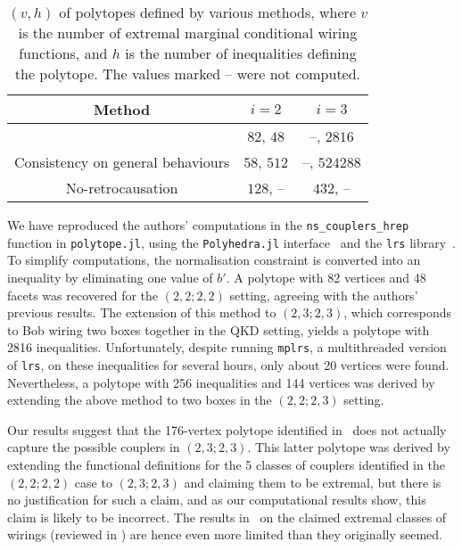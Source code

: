 \documentclass[10pt, a4paper]{article}
\numberwithin{equation}{section} %
\theoremstyle{definition}
\theoremstyle{plain}
\newenvironment{Tabular}[1] %
{\def\arraystretch{1.75}\begin{tabular}{#1}}
{\end{tabular}}
\newcommand{\?}{\mathrel{?}} %
\begin{document}
                  \begin{table}
                    \centering
                    \begin{Tabular}{ccc} 
                      \toprule
                      Method & \(i = 2\) & \(i = 3\) \\
                      \midrule
                      \cite{ShortEntangleSwap} & \(82\), \(48\)  & --, \(2816\) \\
                      Consistency on general behaviours & \(58\), \(512\) & --, \(524288\) \\
                      No-retrocausation & \(128\), -- & \(432\), -- \\
                      \bottomrule
                    \end{Tabular}
                    \caption{\((v,h)\) of polytopes defined by various methods, where \(v\) is the number of extremal marginal conditional wiring functions, and \(h\) is the number of inequalities defining the polytope. The values marked -- were not computed.}\label{tab:polys}
                  \end{table}

                  We have reproduced the authors' computations in the \verb`ns_couplers_hrep` function in \texttt{polytope.jl}, using the \verb`Polyhedra.jl` interface~\cite{Polyhedra} and the \verb`lrs` library~\cite{LRS}. To simplify computations, the normalisation constraint is converted into an inequality by eliminating one value of \(b'\). A polytope with 82 vertices and 48 facets was recovered for the \((2,2;2,2)\) setting, agreeing with the authors' previous results. The extension of this method to \((2,3;2,3)\), which corresponds to Bob wiring two boxes together in the QKD setting, yields a polytope with 2816 inequalities. Unfortunately, despite running \verb`mplrs`, a multithreaded version of \verb`lrs`, on these inequalities for several hours, only about 20 vertices were found. Nevertheless, a polytope with 256 inequalities and 144 vertices was derived by extending the above method to two boxes in the \((2,2;2,3)\) setting.

                  Our results suggest that the 176-vertex polytope identified in~\cite[Sec. 7.1]{JanLiThesis} does not actually capture the possible couplers in \((2,3;2,3)\). This latter polytope was derived by extending the functional definitions for the 5 classes of couplers identified in the \((2,2;2,2)\) case to \((2,3;2,3)\) and claiming them to be extremal, but there is no justification for such a claim, and as our computational results show, this claim is likely to be incorrect. The results in~\cite{JanLiThesis} on the claimed extremal classes of wirings (reviewed in ) are hence even more limited than they originally seemed.
\end{document}
